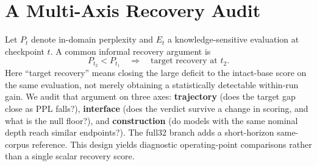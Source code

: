 \section{A Multi-Axis Recovery Audit}
\label{sec:observation}

Let $P_t$ denote in-domain perplexity and $E_t$ a knowledge-sensitive
evaluation at checkpoint $t$. A common informal recovery argument is
\[
P_{t_2}<P_{t_1}\quad\Longrightarrow\quad
\text{target recovery at }t_2 .
\]
Here ``target recovery'' means closing the large deficit to the intact-base
score on the same evaluation, not merely obtaining a statistically detectable
within-run gain. We audit that argument on three axes:
\textbf{trajectory} (does the target gap close as PPL falls?),
\textbf{interface} (does the verdict survive a change in scoring, and what is
the null floor?), and \textbf{construction} (do models with the same nominal
depth reach similar endpoints?). The full32 branch adds a short-horizon
same-corpus reference. This design yields diagnostic operating-point
comparisons rather than a single scalar recovery score.
